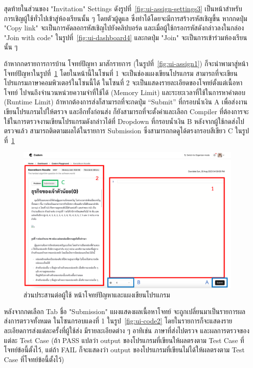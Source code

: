\documentclass[12pt,one side,openright,a4paper]{cpe-thesis-th}
\newcommand{\thaijustify}[1]{%
  \par\hspace{30pt}\justifying
  #1
}
\begin{document}
\thaijustify{
  สุดท้ายในส่วนของ "Invitation" Settings ดังรูปที่~\ref{fig:ui-assign-settings3} เป็นหน้าสำหรับการเชิญผู้ใช้ทั่วไปเข้าสู่ห้องเรียนนั้น ๆ โดยตัวผู้ดูแล ซึ่งทำได้โดยจะมีการสร้างรหัสเชิญขึ้น หากกดปุ่ม "Copy link" จะเป็นการคัดลอกรหัสเชิญไปยังคลิปบอร์ด และเมื่อผู้ใช้กรอกรหัสดังกล่าวลงในกล่อง "Join with code" ในรูปที่~\ref{fig:ui-dashboard4} และกดปุ่ม "Join" จะเป็นการเข้าร่วมห้องเรียนนั้น ๆ
}
\thaijustify{
  ถ้าหากกดรายการการบ้าน โจทย์ปัญหา มาสักรายการ (ในรูปที่~\ref{fig:ui-assign1}) ก็จะนำพามาสู่หน้าโจทย์ปัญหาในรูปที่~\ref{fig:ui-code1} โดยในหน้านี้ในโซนที่ 1 จะเป็นช่องแผงเขียนโปรแกรม สามารถที่จะเขียนโปรแกรมภาษาคอมพิวเตอร์ในโซนนี้ได้ ในโซนที่ 2 จะเป็นแสดงรายละเอียดของโจทย์ตั้งแต่เนื้อหาโจทย์ ไปจนถึงจำนวนหน่วยความจำที่ใช้ได้ (Memory Limit) และระยะเวลาที่ใช้ในการหาคำตอบ (Runtime Limit) ถ้าหากต้องการส่งก็สามารถที่จะกดปุ่ม “Submit” ที่กรอบน้ำเงิน A เพื่อส่งงานเขียนโปรแกรมไปให้ตรวจ และอีกทั้งก่อนส่ง ก็ยังสามารถที่จะตั้งค่าและเลือก Compiler ที่ต้องการจะใช้ในการตรวจงานเขียนโปรแกรมดังกล่าวได้ที่ Dropdown ที่กรอบน้ำเงิน B หลังจากผู้ใช้กดส่งไปตรวจแล้ว สามารถติดตามผลได้ในรายการ Submission ซึ่งสามารถกดดูได้ตรงกรอบสีเขียว C ในรูปที่~\ref{fig:ui-code1}
}
\hypertarget{ui-code1}{
  \begin{figure}[H]
    \centering
    \includegraphics[width=15cm]{figure/ui/ui-code1.png}
    \caption[ส่วนประสานต่อผู้ใช้ หน้าโจทย์ปัญหาและแผงเขียนโปรแกรม]{ส่วนประสานต่อผู้ใช้ หน้าโจทย์ปัญหาและแผงเขียนโปรแกรม}
    \label{fig:ui-code1}
  \end{figure}
}
\thaijustify{
  หลังจากกดเลือก Tab ชื่อ "Submission" แผงแสดงผลเนื้อหาโจทย์ จะถูกเปลี่ยนมาเป็นรายการผลส่งการตรวจทั้งหมด ในโซนกรอบแดงที่ 1 ในรูป~\ref{fig:ui-code2} โดยในรายการก็จะแสดงรายละเอียดการส่งแต่ละครั้งที่ผู้ใช้ส่ง มีรายละเอียดต่าง ๆ อาทิเช่น ภาษาที่ส่งไปตรวจ และผลการตรวจของแต่ละ Test Case (ถ้า PASS แปลว่า output ของโปรแกรมที่เขียนให้ผลตรงตาม Test Case ที่โจทย์ข้อนี้ตั้งไว้, แต่ถ้า FAIL ก็จะแสดงว่า output ของโปรแกรมที่เขียนไม่ได้ให้ผลตรงตาม Test Case ที่โจทย์ข้อนี้ตั้งไว้)
}
\end{document}
